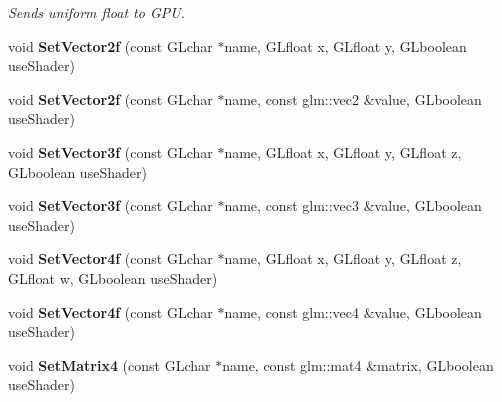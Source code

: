 \begin{DoxyCompactItemize}
\begin{DoxyCompactList}\small\item\em Sends uniform float to G\+P\+U. \end{DoxyCompactList}\item 
\hypertarget{class_shader_a54a5c6215e1605728f49c11c38fbfd85}{void {\bfseries Set\+Vector2f} (const G\+Lchar $\ast$name, G\+Lfloat x, G\+Lfloat y, G\+Lboolean use\+Shader)}\label{class_shader_a54a5c6215e1605728f49c11c38fbfd85}

\item 
\hypertarget{class_shader_a7cf876e31d920a7d9c3c21ce8fd3a687}{void {\bfseries Set\+Vector2f} (const G\+Lchar $\ast$name, const glm\+::vec2 \&value, G\+Lboolean use\+Shader)}\label{class_shader_a7cf876e31d920a7d9c3c21ce8fd3a687}

\item 
\hypertarget{class_shader_aa5191fa6b28fcd18e84d7b8ea5c0e6fb}{void {\bfseries Set\+Vector3f} (const G\+Lchar $\ast$name, G\+Lfloat x, G\+Lfloat y, G\+Lfloat z, G\+Lboolean use\+Shader)}\label{class_shader_aa5191fa6b28fcd18e84d7b8ea5c0e6fb}

\item 
\hypertarget{class_shader_a61719d9b8a28197f3fb2cd683fa941bb}{void {\bfseries Set\+Vector3f} (const G\+Lchar $\ast$name, const glm\+::vec3 \&value, G\+Lboolean use\+Shader)}\label{class_shader_a61719d9b8a28197f3fb2cd683fa941bb}

\item 
\hypertarget{class_shader_a968b3e2164f7ba4c8de1c62f2345dff7}{void {\bfseries Set\+Vector4f} (const G\+Lchar $\ast$name, G\+Lfloat x, G\+Lfloat y, G\+Lfloat z, G\+Lfloat w, G\+Lboolean use\+Shader)}\label{class_shader_a968b3e2164f7ba4c8de1c62f2345dff7}

\item 
\hypertarget{class_shader_ab6c7940076c0a47bcc945065e1b398f5}{void {\bfseries Set\+Vector4f} (const G\+Lchar $\ast$name, const glm\+::vec4 \&value, G\+Lboolean use\+Shader)}\label{class_shader_ab6c7940076c0a47bcc945065e1b398f5}

\item 
\hypertarget{class_shader_adc310069fef7c6fab933f708e25c1257}{void {\bfseries Set\+Matrix4} (const G\+Lchar $\ast$name, const glm\+::mat4 \&matrix, G\+Lboolean use\+Shader)}\label{class_shader_adc310069fef7c6fab933f708e25c1257}

\end{DoxyCompactItemize}
